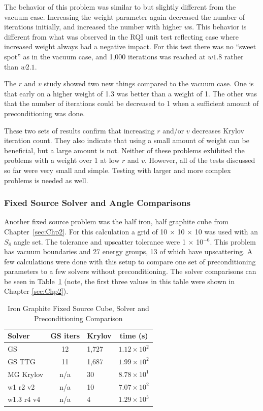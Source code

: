 The behavior of this problem was similar to but slightly different from the vacuum case. Increasing the weight parameter again decreased the number of iterations initially, and increased the number with higher $w$s. This behavior is different from what was observed in the RQI unit test reflecting case where increased weight always had a negative impact. For this test there was no ``sweet spot'' as in the vacuum case, and 1,000 iterations was reached at $w1.8$ rather than $w2.1$.

The $r$ and $v$ study showed two new things compared to the vacuum case. One is that early on a higher weight of 1.3 was better than a weight of 1. The other was that the number of iterations could be decreased to 1 when a sufficient amount of preconditioning was done. 

These two sets of results confirm that increasing $r$ and/or $v$ decreases Krylov iteration count. They also indicate that using a small amount of weight can be beneficial, but a large amount is not. Neither of these problems exhibited the problems with a weight over 1 at low $r$ and $v$. However, all of the tests discussed so far were very small and simple. Testing with larger and more complex problems is needed as well. 

\subsubsection{Fixed Source Solver and Angle Comparisons} 
Another fixed source problem was the half iron, half graphite cube from Chapter~\ref{sec:Chp2}. For this calculation a grid of 10 $\times$ 10 $\times$ 10 was used with an $S_{8}$ angle set. The tolerance and upscatter tolerance were 1 $\times$ 10$^{-6}$. This problem has vacuum boundaries and 27 energy groups, 13 of which have upscattering. A few calculations were done with this setup to compare one set of preconditioning parameters to a few solvers without preconditioning. The solver comparisons can be seen in Table~\ref{table:FeC solvers} (note, the first three values in this table were shown in Chapter \ref{sec:Chp2}). 
%
\begin{table}[!h]
\caption{Iron Graphite Fixed Source Cube, Solver and Preconditioning Comparison}
\begin{center}
\begin{tabular}{| l | c | l | c |}
\hline
Solver & GS iters & Krylov & time (s)\\[0.5ex]
\hline
GS &  12 & 1,727 & $1.12 \times 10^{2}$ \\
GS TTG & 11 & 1,687 & $1.99 \times 10^{2}$  \\
MG Krylov & n/a & 30 & $8.78 \times 10^{1}$ \\
w1 r2 v2 & n/a & 10 & $7.07 \times 10^{2}$ \\
w1.3 r4 v4 & n/a & 4 & $1.29 \times 10^{3}$ \\
\hline
\end{tabular}
\end{center}
\label{table:FeC solvers}
\end{table}

